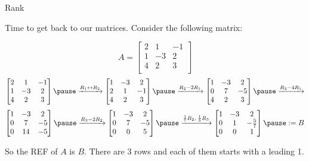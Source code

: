 \documentclass{beamer}
\begin{document}
\begin{frame}{Rank}

Time to get back to our matrices. Consider the following matrix:
        
        $$A = \begin{bmatrix}
            2 & 1 & -1 \\
            1 & -3 & 2 \\
            4 & 2 & 3 \\
        \end{bmatrix}$$    
        \pause
    \begin{equation*}
               \begin{bmatrix}
            2 & 1 & -1 \\
            1 & -3 & 2 \\
            4 & 2 & 3 \\
        \end{bmatrix}\pause
         \xrightarrow{R_1\leftrightarrow R_2} 
        \begin{bmatrix}
            1 & -3 & 2 \\
            2 & 1 & -1 \\
            4 & 2 & 3 \\
        \end{bmatrix}\pause
         \xrightarrow{R_2-2R_1} 
        \begin{bmatrix}
            1 & -3 & 2 \\
            0 & 7 & -5 \\
            4 & 2 & 3 \\
        \end{bmatrix}\pause
         \xrightarrow{R_3-4 R_1} 
        \end{equation*}
        \begin{equation*}
        \begin{bmatrix}
            1 & -3 & 2 \\
            0 & 7 & -5 \\
            0 & 14 & -5 \\
        \end{bmatrix}\pause
         \xrightarrow{R_3-2 R_2} 
        \begin{bmatrix}
            1 & -3 & 2 \\
            0 & 7 & -5 \\
            0 & 0 & 5 \\
        \end{bmatrix}\pause
         \xrightarrow{\frac{1}{7}R_2, \: \frac{1}{5}R_3} 
        \begin{bmatrix}
            1 & -3 & 2 \\
            0 & 1 & -\frac{5}{7} \\
            0 & 0 & 1 \\
        \end{bmatrix}\pause := B
    \end{equation*}


\pause So the REF of $A$ is $B$. There are 3 rows and each of them starts with a leading 1.
    
\end{frame}
\end{document}
